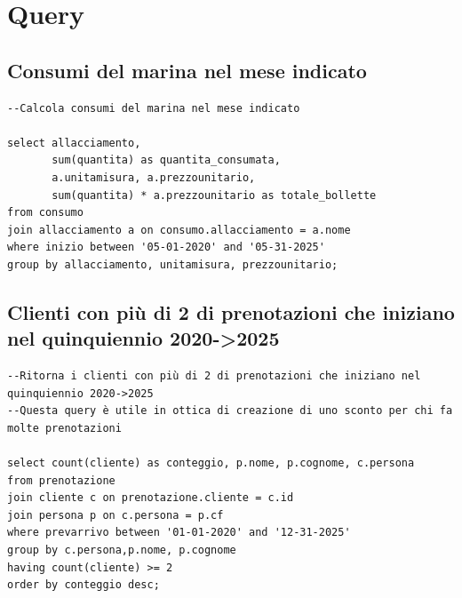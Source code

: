 


\section{Query}

\subsection{Consumi del marina nel mese indicato}
\begin{lstlisting}
--Calcola consumi del marina nel mese indicato

select allacciamento,
       sum(quantita) as quantita_consumata,
       a.unitamisura, a.prezzounitario,
       sum(quantita) * a.prezzounitario as totale_bollette
from consumo
join allacciamento a on consumo.allacciamento = a.nome
where inizio between '05-01-2020' and '05-31-2025'
group by allacciamento, unitamisura, prezzounitario;

\end{lstlisting}

\subsection{Clienti con più di 2 di prenotazioni che iniziano nel quinquiennio 2020->2025}

\begin{lstlisting}
--Ritorna i clienti con più di 2 di prenotazioni che iniziano nel quinquiennio 2020->2025
--Questa query è utile in ottica di creazione di uno sconto per chi fa molte prenotazioni

select count(cliente) as conteggio, p.nome, p.cognome, c.persona
from prenotazione
join cliente c on prenotazione.cliente = c.id
join persona p on c.persona = p.cf
where prevarrivo between '01-01-2020' and '12-31-2025'
group by c.persona,p.nome, p.cognome
having count(cliente) >= 2
order by conteggio desc;
\end{lstlisting}

